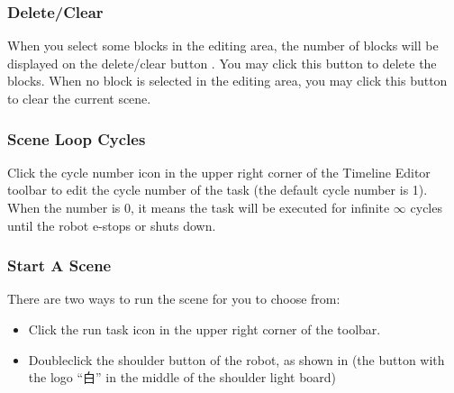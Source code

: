 


\subsubsection{Delete/Clear}
When you select some blocks in the editing area, the number of blocks will be displayed on the delete/clear button . You may click this button to delete the blocks. When no block is selected in the editing area, you may click this button to clear the current scene.





\subsubsection{Scene Loop Cycles}
Click the cycle number icon  in the upper right corner of the Timeline Editor toolbar to edit the cycle number of the task (the default cycle number is 1). When the number is 0, it means the task will be executed for infinite $\infty$ cycles until the robot e-stops or shuts down.


\subsubsection{Start A Scene}
\label{sec:运行场景}
There are two ways to run the scene for you to choose from:
\begin{itemize}
	\item Click the run task icon  in the upper right corner of the toolbar.
	\item Double­click the shoulder button of the robot, as shown in  (the button with the logo ``白'' in the middle of the shoulder light board)
\end{itemize}

